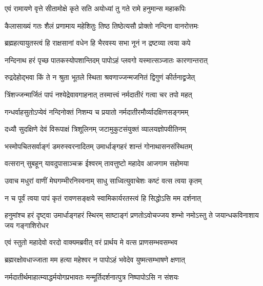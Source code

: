 \twolineshloka
{एवं रामायणे वृत्ते सीतामोक्षे कृते सति}
{अयोध्यां तु गते रामे हनुमान्स महाकपिः}%

\twolineshloka
{कैलासाख्यं गतः शैलं प्रणामाय महेशितुः}
{तिष्ठ तिष्ठेत्यसौ प्रोक्तो नन्दिना वानरोत्तमः}%

\twolineshloka
{ब्रह्महत्यायुतस्त्वं हि राक्षसानां वधेन हि}
{भैरवस्य सभा नूनं न द्रष्टव्या त्वया कपे}%


\twolineshloka
{नन्दिनाथ हरं पृच्छ पातकस्योपशान्तिदम्}
{पापोऽहं प्लवगो यस्मात्सञ्जातः कारणान्तरात्}%


\twolineshloka
{रुद्रदेहोद्भवा किं ते न श्रुता भूतले स्थिता}
{श्रवणाज्जन्मजनितं द्विगुणं कीर्तनाद्व्रजेत्}%

\twolineshloka
{त्रिंशज्जन्मार्जितं पापं नश्येद्रेवावगाहनात्}
{तस्मात्त्वं नर्मदातीरं गत्वा चर तपो महत्}%

\twolineshloka
{गन्धर्वाहसुतोऽप्येवं नन्दिनोक्तं निशम्य च}
{प्रयातो नर्मदातीरमौर्व्यादक्षिणसङ्गमम्}%

\twolineshloka
{दध्यौ सुदक्षिणे देवं विरूपाक्षं त्रिशूलिनम्}
{जटामुकुटसंयुक्तं व्यालयज्ञोपवीतिनम्}%

\twolineshloka
{भस्मोपचितसर्वाङ्गं डमरुस्वरनादितम्}
{उमार्धाङ्गहरं शान्तं गोनाथासनसंस्थितम्}%

\twolineshloka
{वत्सरान् सुबहून् यावदुपासाञ्चक्र ईश्वरम्}
{तावत्तुष्टो महादेव आजगाम सहोमया}%

\twolineshloka
{उवाच मधुरां वाणीं मेघगम्भीरनिस्वनाम्}
{साधु साध्वित्युवाचेशः कष्टं वत्स त्वया कृतम्}%

\twolineshloka
{न च पूर्वं त्वया पापं कृतं रावणसङ्क्षये}
{स्वामिकार्यरतस्त्वं हि सिद्धोऽसि मम दर्शनात्}%

\threelineshloka
{हनुमांश्च हरं दृष्ट्वा उमार्धाङ्गहरं स्थिरम्}
{साष्टाङ्गं प्रणतोऽवोचज्जय शम्भो नमोऽस्तु ते}
{जयान्धकविनाशाय जय गङ्गाशिरोधर}%

\twolineshloka
{एवं स्तुतो महादेवो वरदो वाक्यमब्रवीत्}
{वरं प्रार्थय मे वत्स प्राणसम्भवसम्भव}%


\twolineshloka
{ब्रह्मरक्षोवधाज्जाता मम हत्या महेश्वर}
{न पापोऽहं भवेदेव युष्मत्सम्भाषणे क्षणात्}%


\twolineshloka
{नर्मदातीर्थमाहात्म्याद्धर्मयोगप्रभावतः}
{मन्मूर्तिदर्शनात्पुत्र निष्पापोऽसि न संशयः}%


